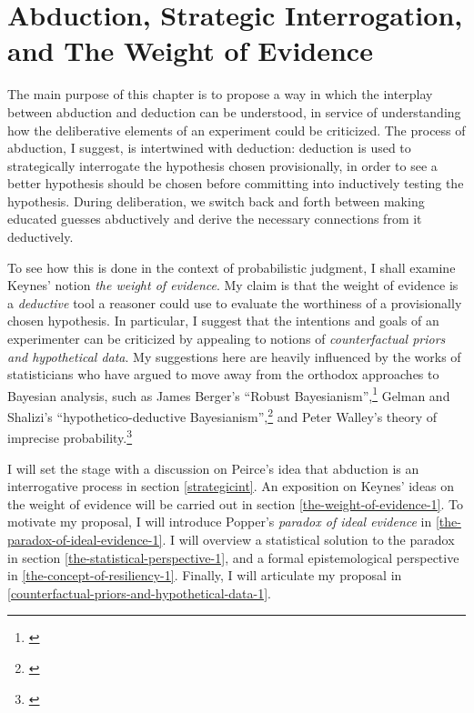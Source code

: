 
\hypertarget{abduction-resiliency-and-the-weight-of-evidence-1}{%
\chapter{Abduction, Strategic Interrogation, and The Weight of
Evidence}\label{ch:woe}}



The main purpose of this chapter is to propose a way in which the interplay between abduction and deduction can be understood, in service of understanding how the deliberative elements of an experiment could be criticized. The process of abduction, I suggest, is intertwined with deduction: deduction is used to strategically interrogate the hypothesis chosen provisionally, in order to see a better hypothesis should be chosen before committing into inductively testing the hypothesis. During deliberation, we switch back and forth between making educated guesses abductively and derive the necessary connections from it deductively. 

To see how this is done in the context of probabilistic judgment, I shall examine Keynes' notion \emph{the weight of evidence}. My claim is that the weight of evidence is a \emph{deductive} tool a reasoner could use to evaluate the worthiness of a provisionally chosen hypothesis. In particular, I suggest that the intentions and goals of an experimenter can be criticized by appealing to notions of \emph{counterfactual priors and hypothetical data}. My suggestions here are heavily influenced by the works of statisticians
who have argued to move away from the orthodox approaches to Bayesian
analysis, such as James Berger's ``Robust Bayesianism'',\footnote{\cite{robust}} Gelman and
Shalizi's ``hypothetico-deductive Bayesianism'',\footnote{\cite{gelman}} and Peter Walley's theory of imprecise probability.\footnote{\cite{walley}}



I will set the stage with a discussion on Peirce's idea that abduction is an interrogative process in section \ref{strategicint}. An exposition on Keynes' ideas on the weight of evidence will be carried out in section \ref{the-weight-of-evidence-1}. To motivate my proposal, I will introduce Popper's \emph{paradox of ideal evidence} in \ref{the-paradox-of-ideal-evidence-1}. I will overview a statistical solution to the paradox in section \ref{the-statistical-perspective-1}, and a formal epistemological perspective in \ref{the-concept-of-resiliency-1}. Finally, I will articulate my proposal in \ref{counterfactual-priors-and-hypothetical-data-1}.

